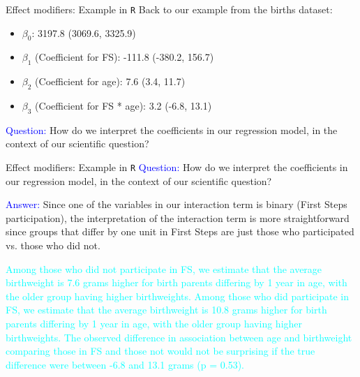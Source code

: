 \documentclass[10pt,t]{beamer}
\begin{document}
\begin{frame}{Effect modifiers: Example in \texttt{R}}
Back to our example from the births dataset:

\vspace{0.3cm}

\begin{itemize}
	\item $\beta_0$: 3197.8 (3069.6, 3325.9)
	\item $\beta_1$ (Coefficient for FS): -111.8 (-380.2, 156.7)
	\item $\beta_2$ (Coefficient for age): 7.6 (3.4, 11.7)
	\item $\beta_3$ (Coefficient for FS * age): 3.2 (-6.8, 13.1)
\end{itemize}

\vspace{0.3cm}


\textcolor{blue}{Question:} How do we interpret the coefficients in our regression model, in the context of our scientific question? 
\end{frame}

\begin{frame}{Effect modifiers: Example in \texttt{R}}
\textcolor{blue}{Question:} How do we interpret the coefficients in our regression model, in the context of our scientific question? 

\vspace{0.3cm}

\textcolor{blue}{Answer:} Since one of the variables in our interaction term is binary (First Steps participation), the interpretation of the interaction term is more straightforward since groups that differ by one unit in First Steps are just those who participated vs. those who did not.

\vspace{0.3cm}

\textcolor{cyan}{Among those who did not participate in FS, we estimate that the average birthweight is 7.6 grams higher for birth parents differing by 1 year in age, with the older group having higher birthweights. Among those who did participate in FS, we estimate that the average birthweight is 10.8 grams higher for birth parents differing by 1 year in age, with the older group having higher birthweights. The observed difference in association between age and birthweight comparing those in FS and those not would not be surprising if the true difference were between -6.8 and 13.1 grams (p = 0.53).}

\end{frame}
\end{document}
